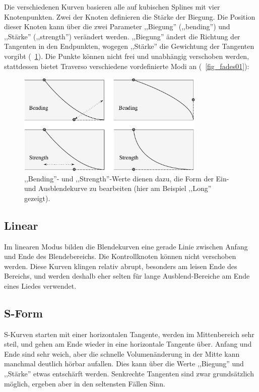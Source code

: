 Die verschiedenen Kurven basieren alle auf kubischen Splines mit vier Knotenpunkten. Zwei der Knoten definieren die Stärke der Biegung. Die Position dieser Knoten kann über die zwei Parameter ,,Biegung'' (,,bending'') und ,,Stärke'' (,,strength'') verändert werden. ,,Biegung'' ändert die Richtung der Tangenten in den Endpunkten, wogegen ,,Stärke'' die Gewichtung der Tangenten vorgibt (\FigB~\ref{fig_fades02}). Die Punkte können nicht frei und unabhängig verschoben werden, stattdessen bietet Traverso verschiedene vordefinierte Modi an (\FigB~\ref{fig_fades01}):

\begin{figure}[t]
 \centering\includegraphics[width=0.8\textwidth]{images/fades2}
 \caption{,,Bending''- und ,,Strength''-Werte dienen dazu, die Form der Ein- und Ausblendekurve zu bearbeiten (hier am Beispiel ,,Long'' gezeigt).}
 \label{fig_fades02}
\end{figure}

\subsection{Linear}
Im linearen Modus bilden die Blendekurven eine gerade Linie zwischen Anfang und Ende des Blendebereichs. Die Kontrollknoten können nicht verschoben werden. Diese Kurven klingen relativ abrupt, besonders am leisen Ende des Bereichs, und werden deshalb eher selten für lange Ausblend-Bereiche am Ende eines Liedes verwendet.

\subsection{S-Form}
S-Kurven starten mit einer horizontalen Tangente, werden im Mittenbereich sehr steil, und gehen am Ende wieder in eine horizontale Tangente über. Anfang und Ende sind sehr weich, aber die schnelle Volumenänderung in der Mitte kann manchmal deutlich hörbar aufallen. Dies kann über die Werte ,,Biegung'' und ,,Stärke'' etwas entschärft werden. Senkrechte Tangenten sind zwar grundsätzlich möglich, ergeben aber in den seltensten Fällen Sinn.

